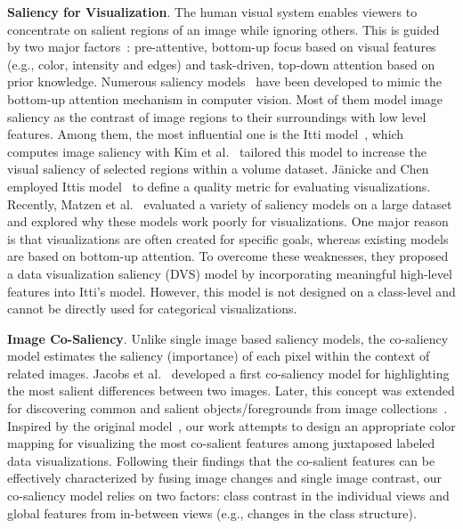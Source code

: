 \vspace{1.5mm}
\noindent\textbf{Saliency for Visualization}.
The human visual system enables viewers to concentrate on salient regions of an image while ignoring others. This is guided by two major factors~\cite{connor2004visual}: pre-attentive, bottom-up focus based on visual features (e.g., color, intensity and edges) and task-driven, top-down attention based on prior knowledge. %
Numerous saliency models~\cite{borji2019salient} have been developed to mimic the bottom-up attention mechanism in computer vision.
Most of them model image saliency as the contrast of image regions to their surroundings with low level features. Among them, the most influential one is the Itti model~\cite{Itti98}, which computes image saliency with 
Kim et al.~\cite{Kim06} tailored this model to increase the visual saliency of selected regions within a volume dataset.  
Jänicke and Chen~\cite{Janicke10} employed Ittis model~\cite{Itti98} to define a quality metric for evaluating visualizations.
Recently, Matzen et al.~\cite{Matzen18} evaluated a variety of saliency models on a large dataset and explored why these models work poorly for visualizations. One major reason is that visualizations are often created for specific goals, whereas existing models are based on  bottom-up attention. To overcome these weaknesses, they proposed a data visualization saliency (DVS) model by incorporating meaningful high-level features into Itti's model. However, this model is not designed on a class-level and cannot be directly used for categorical visualizations.

\vspace{1.5mm}
\noindent\textbf{Image Co-Saliency}.
Unlike single image based saliency models, the co-saliency model estimates the saliency (importance) of each pixel within the context of related images. Jacobs et al.~\cite{Jacobs10} developed a first co-saliency model for highlighting the most salient differences between two  images.  Later, this concept was extended for discovering common and salient objects/foregrounds from image collections~\cite{zhang2018review}. Inspired by the original model~\cite{Jacobs10}, our work attempts to design an appropriate color mapping for visualizing the most co-salient features among juxtaposed labeled data visualizations. Following their findings that the co-salient features can be effectively characterized by fusing image changes and single image contrast, our co-saliency model relies on two factors: class contrast in the individual views  and global features from in-between views (e.g., changes in the class structure).
